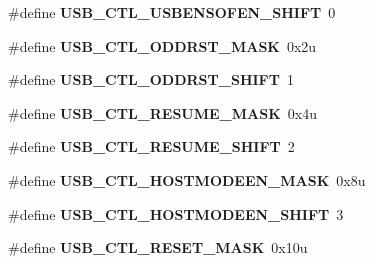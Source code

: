 \begin{DoxyCompactItemize}
\item 
\#define {\bfseries U\+S\+B\+\_\+\+C\+T\+L\+\_\+\+U\+S\+B\+E\+N\+S\+O\+F\+E\+N\+\_\+\+S\+H\+I\+FT}~0\hypertarget{group__USB__Register__Masks_ga674ca18da1675b8ae48c65ca4203da36}{}\label{group__USB__Register__Masks_ga674ca18da1675b8ae48c65ca4203da36}

\item 
\#define {\bfseries U\+S\+B\+\_\+\+C\+T\+L\+\_\+\+O\+D\+D\+R\+S\+T\+\_\+\+M\+A\+SK}~0x2u\hypertarget{group__USB__Register__Masks_ga70907cc5c00bad68669ef02ec1332bfc}{}\label{group__USB__Register__Masks_ga70907cc5c00bad68669ef02ec1332bfc}

\item 
\#define {\bfseries U\+S\+B\+\_\+\+C\+T\+L\+\_\+\+O\+D\+D\+R\+S\+T\+\_\+\+S\+H\+I\+FT}~1\hypertarget{group__USB__Register__Masks_ga6e2ea6a3166748c567d22a767c69f98d}{}\label{group__USB__Register__Masks_ga6e2ea6a3166748c567d22a767c69f98d}

\item 
\#define {\bfseries U\+S\+B\+\_\+\+C\+T\+L\+\_\+\+R\+E\+S\+U\+M\+E\+\_\+\+M\+A\+SK}~0x4u\hypertarget{group__USB__Register__Masks_ga4e385fa5cf2157ef30a39c1c2b766cd3}{}\label{group__USB__Register__Masks_ga4e385fa5cf2157ef30a39c1c2b766cd3}

\item 
\#define {\bfseries U\+S\+B\+\_\+\+C\+T\+L\+\_\+\+R\+E\+S\+U\+M\+E\+\_\+\+S\+H\+I\+FT}~2\hypertarget{group__USB__Register__Masks_gab8354dafb3b0cb438770fe60ffec4714}{}\label{group__USB__Register__Masks_gab8354dafb3b0cb438770fe60ffec4714}

\item 
\#define {\bfseries U\+S\+B\+\_\+\+C\+T\+L\+\_\+\+H\+O\+S\+T\+M\+O\+D\+E\+E\+N\+\_\+\+M\+A\+SK}~0x8u\hypertarget{group__USB__Register__Masks_gaddf09c4e93070675c5c93c711518250c}{}\label{group__USB__Register__Masks_gaddf09c4e93070675c5c93c711518250c}

\item 
\#define {\bfseries U\+S\+B\+\_\+\+C\+T\+L\+\_\+\+H\+O\+S\+T\+M\+O\+D\+E\+E\+N\+\_\+\+S\+H\+I\+FT}~3\hypertarget{group__USB__Register__Masks_ga87a32a06006794e2dd638fd2bb2eb788}{}\label{group__USB__Register__Masks_ga87a32a06006794e2dd638fd2bb2eb788}

\item 
\#define {\bfseries U\+S\+B\+\_\+\+C\+T\+L\+\_\+\+R\+E\+S\+E\+T\+\_\+\+M\+A\+SK}~0x10u\hypertarget{group__USB__Register__Masks_ga6e3734900ace59f3dedf7a8f246721d7}{}\label{group__USB__Register__Masks_ga6e3734900ace59f3dedf7a8f246721d7}


\end{DoxyCompactItemize}
